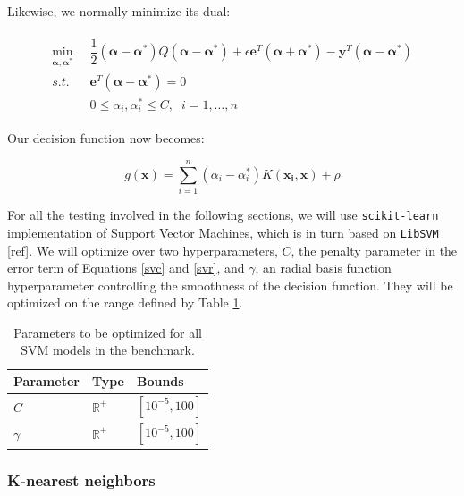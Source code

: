 \documentclass[10pt,a4paper,twoside]{book}
\begin{document}
Likewise, we normally minimize its dual:

\begin{align}\label{svr}
\begin{split}
\min_{\boldsymbol{\alpha}, \boldsymbol{\alpha}^*}\;\;& \dfrac{1}{2}(\boldsymbol{\alpha} - \boldsymbol{\alpha}^*) Q(\boldsymbol{\alpha} - \boldsymbol{\alpha}^*) + \epsilon \boldsymbol{e}^T(\boldsymbol{\alpha} + \boldsymbol{\alpha}^*) - \boldsymbol{y}^T(\boldsymbol{\alpha} - \boldsymbol{\alpha}^*)\\
s.t. \;\; & \boldsymbol{e}^T(\boldsymbol{\alpha} - \boldsymbol{\alpha}^*) = 0\\
\;\; & 0 \leq \alpha_i, \alpha_i^* \leq C, \;\; i=1,\dots,n
\end{split}
\end{align}

Our decision function now becomes:

\begin{equation}
g(\boldsymbol{x}) = \sum_{i=1}^n (\alpha_i - \alpha_i^*) K(\boldsymbol{x_i}, \boldsymbol{x}) + \rho
\end{equation}

For all the testing involved in the following sections, we will use \texttt{scikit-learn} implementation of Support Vector Machines, which is in turn based on \texttt{LibSVM} [ref]. We will optimize over two hyperparameters, $C$, the penalty parameter in the error term of Equations \ref{svc} and \ref{svr}, and $\gamma$, an radial basis function hyperparameter controlling the smoothness of the decision function. They will be optimized on the range defined by Table \ref{svmparam}.


\begin{table}[]
\centering
\caption{Parameters to be optimized for all SVM models in the benchmark.}
\label{svmparam}
\begin{tabular}{@{}lll@{}}
\toprule
\textbf{Parameter} & \textbf{Type}                      & \textbf{Bounds}               \\ \midrule
$C$                & $\mathbb{R}^+$ & $\left[ 10^{-5}, 100 \right]$ \\
$\gamma$           & $\mathbb{R}^+$ & $\left[10^{-5}, 100 \right]$  \\ \bottomrule
\end{tabular}
\end{table}


\subsubsection{K-nearest neighbors}
\end{document}
